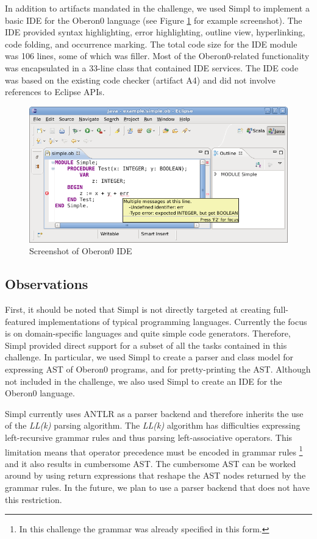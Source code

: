 In addition to artifacts mandated in the challenge, we used Simpl
to implement a basic IDE for the Oberon0 language (see Figure \ref{fig:Screenshot-of-Oberon0}
for example screenshot). The IDE provided syntax highlighting, error
highlighting, outline view, hyperlinking, code folding, and occurrence
marking. The total code size for the IDE module was 106 lines, some
of which was filler. Most of the Oberon0-related functionality was
encapsulated in a 33-line class that contained IDE services. The IDE
code was based on the existing code checker (artifact A4) and did
not involve references to Eclipse APIs. 

\begin{figure}[!h]
\includegraphics[width=12cm]{simpl/ide-screenshot.png}

\caption{\label{fig:Screenshot-of-Oberon0}Screenshot of Oberon0 IDE}
\end{figure}





\subsection{Observations}

First, it should be noted that Simpl is not directly targeted at creating
full-featured implementations of typical programming languages. Currently
the focus is on domain-specific languages and quite simple code generators.
Therefore, Simpl provided direct support for a subset of all the tasks
contained in this challenge. In particular, we used Simpl to create
a parser and class model for expressing AST of Oberon0 programs, and
for pretty-printing the AST. Although not included in the challenge,
we also used Simpl to create an IDE for the Oberon0 language.

Simpl currently uses ANTLR as a parser backend and therefore inherits
the use of the \emph{LL(k)} parsing algorithm. The \emph{LL(k)} algorithm
has difficulties expressing left-recursive grammar rules and thus
parsing left-associative operators. This limitation means that operator
precedence must be encoded in grammar rules%
\footnote{In this challenge the grammar was already specified in this form.%
} and it also results in cumbersome AST. The cumbersome AST can be
worked around by using return expressions that reshape the AST nodes
returned by the grammar rules. In the future, we plan to use a parser
backend that does not have this restriction.

